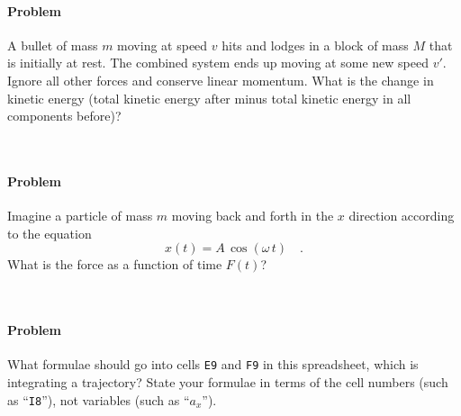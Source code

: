 \documentclass[12pt]{article}
\newcommand{\cell}[1]{\texttt{{#1}}}
\newcounter{problem}
\begin{document}
\paragraph{Problem~\theproblem}%
A bullet of mass $m$ moving at speed $v$ hits and lodges in a block of
mass $M$ that is initially at rest.  The combined system ends up
moving at some new speed $v'$.  Ignore all other forces and conserve
linear momentum.  What is the change in kinetic energy (total kinetic
energy after minus total kinetic energy in all components before)?

~ \vfill ~

\clearpage

\paragraph{Problem~\theproblem}%
Imagine a particle of mass $m$ moving back and forth in the $x$
direction according to the equation
\begin{equation}
x(t)= A\,\cos\left(\omega\,t\right) \quad .
\end{equation}
What is the force as a function of time $F(t)$?

~ \vfill ~

\paragraph{Problem~\theproblem}%
What formulae should go into cells \cell{E9} and \cell{F9} in this
spreadsheet, which is integrating a trajectory?  State your formulae
in terms of the cell numbers (such as ``\cell{I8}''), not variables
(such as ``$a_x$''). \\

~ \vfill ~

\clearpage
\end{document}
